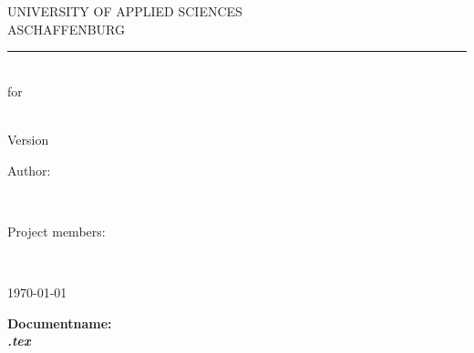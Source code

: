 \documentclass[a4paper]{scrreprt}
\begin{document}
\sffamily

\begin{titlepage}
	\begin{flushleft}
		\begin{LARGE}
			UNIVERSITY OF APPLIED SCIENCES \\ ASCHAFFENBURG
		\end{LARGE}
	\end{flushleft}

	\rule{15cm}{5pt}\vskip1cm

	\begin{flushright}
		\begin{bfseries}
			\begin{Huge}
				\documentname\\
				\vspace{1cm}
				for\\
				\vspace{1cm}
				\projectname\\
			\end{Huge}

			\vspace{1.2cm}

			\begin{Large}
				Version \docversion \docstatus\\
			\end{Large}
		\end{bfseries}

		\vspace{1.5cm}

		\begin{Large}
			\begin{bfseries}
				Author: \\
			\end{bfseries}
			\authors\\

			\vspace{1cm}

			\begin{bfseries}
				Project members: \\
			\end{bfseries}
			\projectmembers\\
		\end{Large}
		
		\vspace{1.5cm}

		\begin{bfseries} 
			\today\\ 
		\end{bfseries}

		\vspace{0.5cm}

		\small \bfseries{Documentname:}\\ \mdseries \textit{\jobname .tex}
	\end{flushright}
\end{titlepage}
\end{document}
